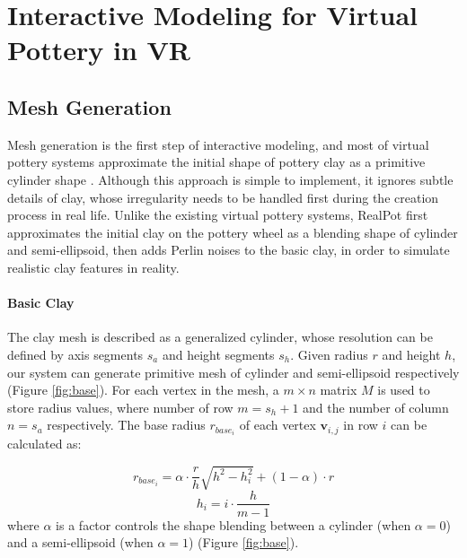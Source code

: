 \documentclass{svjour3}                     %
\begin{document}
\section{Interactive Modeling for Virtual Pottery in VR}
\label{sec:4}

\subsection{Mesh Generation}
\label{sec:4.1}

Mesh generation is the first step of interactive modeling, and most of virtual pottery systems approximate the initial shape of pottery clay as a primitive cylinder shape \cite{han2007ar,ramani2015gesture,ramani2016extracting}.
Although this approach is simple to implement, it ignores subtle details of clay, whose irregularity needs to be handled first during the creation process in real life.
Unlike the existing virtual pottery systems, RealPot first approximates the initial clay on the pottery wheel as a blending shape of cylinder and semi-ellipsoid, then adds Perlin noises to the basic clay, in order to simulate realistic clay features in reality.

\paragraph{Basic Clay} The clay mesh is described as a generalized cylinder, whose resolution can be defined by axis segments $s_{a}$ and height segments $s_{h}$. Given radius $r$ and height $h$, our system can generate primitive mesh of cylinder and semi-ellipsoid respectively (Figure \ref{fig:base}).
For each vertex in the mesh, a $m \times n$ matrix $M$ is used to store radius values, where number of row $m = s_{h} + 1$ and the number of column $n = s_{a}$ respectively. The base radius $r_{base_{i}}$ of each vertex $\mathbf{v}_{i,j}$ in row $i$ can be calculated as: 

\begin{equation}
r_{base_{i}} = \alpha \cdot \frac{r}{h} \sqrt{h^2 -  h_{i}^2} + (1 - \alpha) \cdot r
\end{equation}
\begin{equation}
h_{i} = i \cdot \frac{h}{m-1}
\end{equation}
where $\alpha$ is a factor controls the shape blending between a  cylinder (when $\alpha=0$) and a semi-ellipsoid (when $\alpha=1$) (Figure \ref{fig:base}).
\end{document}

